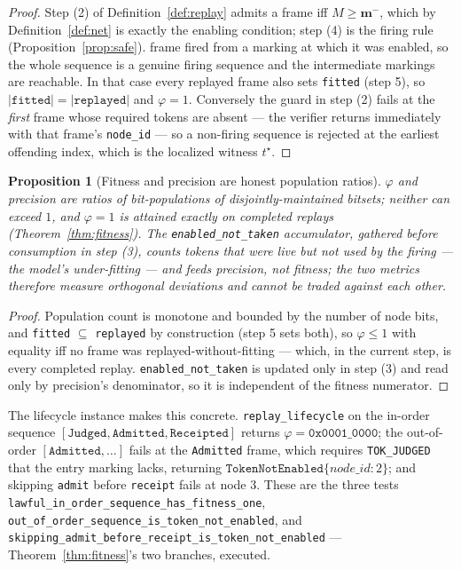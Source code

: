 \documentclass[11pt,oneside]{book}
\theoremstyle{definition}
\theoremstyle{plain}
\newtheorem{proposition}[theorem]{Proposition}
\theoremstyle{remark}
\newcommand{\Fitness}{\varphi}
\newcommand{\preset}{\mathbf{m}^{-}}
\newcommand{\code}[1]{\texttt{#1}}
\begin{document}
\begin{proof}
Step (2) of Definition~\ref{def:replay} admits a frame iff $M\ge\preset$, which by
Definition~\ref{def:net} is exactly the enabling condition; step (4) is the firing rule
(Proposition~\ref{prop:safe}).%
frame fired from a marking at which it was enabled, so the whole sequence is a genuine firing
sequence and the intermediate markings are reachable. In that case every replayed frame also
sets \code{fitted} (step 5), so $|\code{fitted}|=|\code{replayed}|$ and
$\Fitness=1$. Conversely the guard in step (2) fails at the \emph{first} frame whose
required tokens are absent --- the verifier returns immediately with that frame's
\code{node\_id} --- so a non-firing sequence is rejected at the earliest offending index, which
is the localized witness $t^{\star}$. \end{proof}

\begin{proposition}[Fitness and precision are honest population ratios]\label{prop:honest}
$\Fitness$ and precision are ratios of bit-populations of disjointly-maintained bitsets;
neither can exceed $1$, and $\Fitness=1$ is attained exactly on completed replays
(Theorem~\ref{thm:fitness}). The \code{enabled\_not\_taken} accumulator, gathered
\emph{before} consumption in step (3), counts tokens that were live but not used by the firing
--- the model's under-fitting --- and feeds precision, not fitness; the two metrics therefore
measure orthogonal deviations and cannot be traded against each other.
\end{proposition}

\begin{proof}
Population count is monotone and bounded by the number of node bits, and \code{fitted}
$\subseteq$ \code{replayed} by construction (step 5 sets both), so $\Fitness\le 1$ with
equality iff no frame was replayed-without-fitting --- which, in the current step, is every
completed replay. \code{enabled\_not\_taken} is updated only in step (3) and read only by
precision's denominator, so it is independent of the fitness numerator. \end{proof}

The lifecycle instance makes this concrete. \code{replay\_lifecycle} on the in-order sequence
$[\code{Judged},\code{Admitted},\code{Receipted}]$ returns $\Fitness=\code{0x0001\_0000}$; the
out-of-order $[\code{Admitted},\dots]$ fails at the \code{Admitted} frame, which requires
\code{TOK\_JUDGED} that the entry marking lacks, returning
$\code{TokenNotEnabled}\{node\_id:2\}$; and skipping \code{admit} before \code{receipt} fails at
node $3$. These are the three tests \code{lawful\_in\_order\_sequence\_has\_fitness\_one},
\code{out\_of\_order\_sequence\_is\_token\_not\_enabled}, and
\code{skipping\_admit\_before\_receipt\_is\_token\_not\_enabled} --- Theorem~\ref{thm:fitness}'s
two branches, executed.
\end{document}
